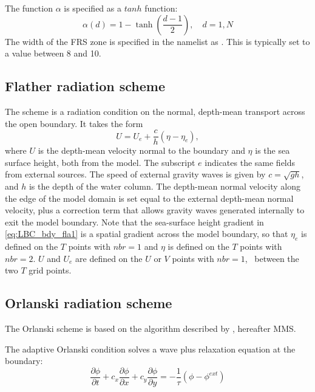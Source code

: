 \documentclass[../main/NEMO_manual]{subfiles}
\begin{document}
The function $\alpha$ is specified as a $tanh$ function:
\[
  \alpha(d) = 1 - \tanh\left(\frac{d-1}{2}\right),       \quad d=1,N
\]
The width of the FRS zone is specified in the namelist as .
This is typically set to a value between 8 and 10.

\subsection{Flather radiation scheme}
\label{subsec:LBC_bdy_flather_scheme}

The \citet{flather_JPO94} scheme is a radiation condition on the normal,
depth-mean transport across the open boundary.
It takes the form
\begin{equation}
  \label{eq:LBC_bdy_fla1}
  U = U_{e} + \frac{c}{h}\left(\eta - \eta_{e}\right),
\end{equation}
where $U$ is the depth-mean velocity normal to the boundary and $\eta$ is the sea surface height,
both from the model.
The subscript $e$ indicates the same fields from external sources.
The speed of external gravity waves is given by $c = \sqrt{gh}$, and $h$ is the depth of the water column.
The depth-mean normal velocity along the edge of the model domain is set equal to
the external depth-mean normal velocity,
plus a correction term that allows gravity waves generated internally to exit the model boundary.
Note that the sea-surface height gradient in \autoref{eq:LBC_bdy_fla1} is a spatial gradient across the model boundary,
so that $\eta_{e}$ is defined on the $T$ points with $nbr=1$ and $\eta$ is defined on the $T$ points with $nbr=2$.
$U$ and $U_{e}$ are defined on the $U$ or $V$ points with $nbr=1$, \ie\ between the two $T$ grid points.

\subsection{Orlanski radiation scheme}
\label{subsec:LBC_bdy_orlanski_scheme}

The Orlanski scheme is based on the algorithm described by \citep{marchesiello.mcwilliams.ea_OM01}, hereafter MMS.

The adaptive Orlanski condition solves a wave plus relaxation equation at the boundary:
\begin{equation}
  \label{eq:LBC_wave_continuous}
  \frac{\partial\phi}{\partial t} + c_x \frac{\partial\phi}{\partial x} + c_y \frac{\partial\phi}{\partial y} =
  -\frac{1}{\tau}(\phi - \phi^{ext})
\end{equation}
\end{document}
